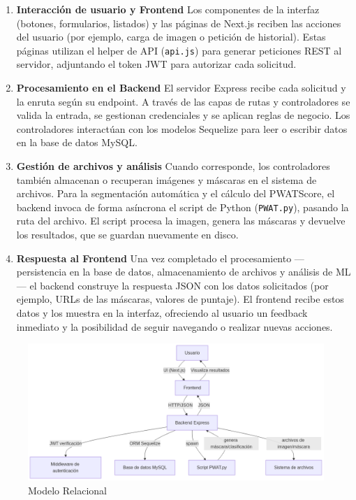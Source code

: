 \begin{enumerate}
  \item \textbf{Interacción de usuario y Frontend}  
    Los componentes de la interfaz (botones, formularios, listados) y las páginas de Next.js reciben las acciones del usuario (por ejemplo, carga de imagen o petición de historial). Estas páginas utilizan el helper de API (\texttt{api.js}) para generar peticiones REST al servidor, adjuntando el token JWT para autorizar cada solicitud.
  
  \item \textbf{Procesamiento en el Backend}  
    El servidor Express recibe cada solicitud y la enruta según su endpoint. A través de las capas de rutas y controladores se valida la entrada, se gestionan credenciales y se aplican reglas de negocio. Los controladores interactúan con los modelos Sequelize para leer o escribir datos en la base de datos MySQL.
  
  \item \textbf{Gestión de archivos y análisis}  
    Cuando corresponde, los controladores también almacenan o recuperan imágenes y máscaras en el sistema de archivos. Para la segmentación automática y el cálculo del PWATScore, el backend invoca de forma asíncrona el script de Python (\texttt{PWAT.py}), pasando la ruta del archivo. El script procesa la imagen, genera las máscaras y devuelve los resultados, que se guardan nuevamente en disco.
  
  \item \textbf{Respuesta al Frontend}  
    Una vez completado el procesamiento —persistencia en la base de datos, almacenamiento de archivos y análisis de ML— el backend construye la respuesta JSON con los datos solicitados (por ejemplo, URLs de las máscaras, valores de puntaje). El frontend recibe estos datos y los muestra en la interfaz, ofreciendo al usuario un feedback inmediato y la posibilidad de seguir navegando o realizar nuevas acciones.
\end{enumerate}

\begin{figure}[H]
    \centering
    \includegraphics[width=1\linewidth]{imagenes/flujo.png}
    \caption{Modelo Relacional}
    \label{fig:classesDiagram}
\end{figure}


